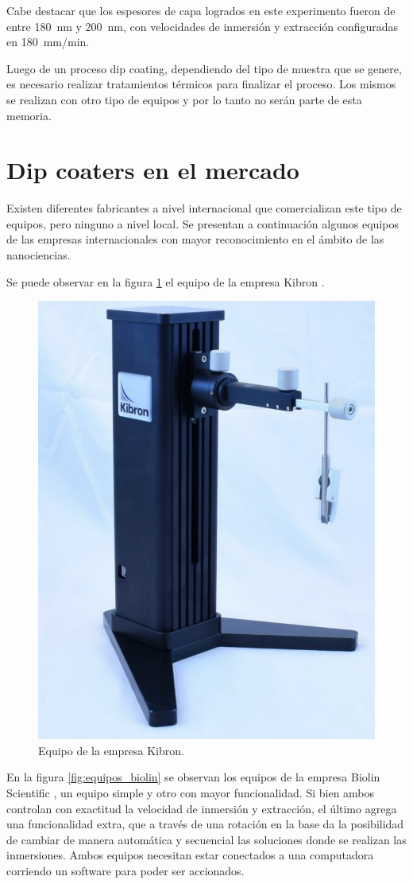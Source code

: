 

Cabe destacar que los espesores de capa logrados en este experimento fueron de entre \SI{180}{nm} y \SI{200}{nm}, con velocidades de inmersión y extracción configuradas en \SI{180}{mm/min}.

Luego de un proceso dip coating, dependiendo del tipo de muestra que se genere, es necesario realizar tratamientos térmicos para finalizar el proceso. Los mismos se realizan con otro tipo de equipos y por lo tanto no serán parte de esta memoria.
 
\label{sec:dip coating}

\section{Dip coaters en el mercado}
\label{sec:mercado}
Existen diferentes fabricantes a nivel internacional que comercializan este tipo de equipos, pero ninguno a nivel local. Se presentan a continuación algunos equipos de las empresas internacionales con mayor reconocimiento en el ámbito de las nanociencias. 

Se puede observar en la figura \ref{fig:dip_kibron} el equipo de la empresa Kibron \citep{2_web_kibron}.

\begin{figure}[htbp]
	\centering
	\includegraphics[width=.25\textwidth]{./Figures/kibron.pdf}
	\caption{Equipo de la empresa Kibron.}
	\label{fig:dip_kibron}
\end{figure}

En la figura \ref{fig:equipos_biolin} se observan los equipos de la empresa Biolin Scientific  \citep{1_web_biolin}, un equipo simple y otro con mayor funcionalidad. Si bien ambos controlan con exactitud la velocidad de inmersión y extracción, el último agrega una funcionalidad extra, que a través de una rotación en la base da la posibilidad de cambiar de manera automática y secuencial las soluciones donde se realizan las inmersiones. Ambos equipos necesitan estar conectados a una computadora corriendo un software para poder ser accionados.

